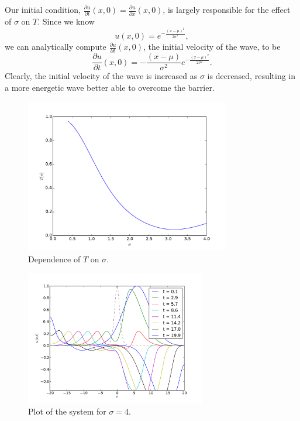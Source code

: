 \documentclass[10pt]{article}
\begin{document}
Our initial condition, $\frac{\partial u}{\partial t}(x,0) = \frac{\partial u}{\partial x} (x,0)$,
is largely responsible for the effect of $\sigma$ on $T$. Since we know
$$ u(x,0) = e^{-\frac{(x-\mu)^2}{2\sigma^2}},$$
we can analytically compute $\frac{\partial u}{\partial t}(x,0)$, the initial velocity
of the wave, to be
$$ \frac{\partial u}{\partial t}(x,0) = -\frac{(x-\mu)}{\sigma^2}e^{-\frac{(x-\mu)^2}{2\sigma^2}}. $$
Clearly, the initial velocity of the wave is increased as $\sigma$ is decreased, resulting in
a more energetic wave better able to overcome the barrier.

\begin{figure}
  \centering
  \includegraphics[width=0.8\textwidth]{2/sigma.pdf}
  \caption{Dependence of $T$ on $\sigma$.}
  \label{f:sigma}
\end{figure}

\begin{figure}
  \centering
  \includegraphics[width=0.7\textwidth]{2/bigsig.pdf}
  \caption{Plot of the system for $\sigma=4$.}
  \label{f:bigsig}
\end{figure}
\end{document}
